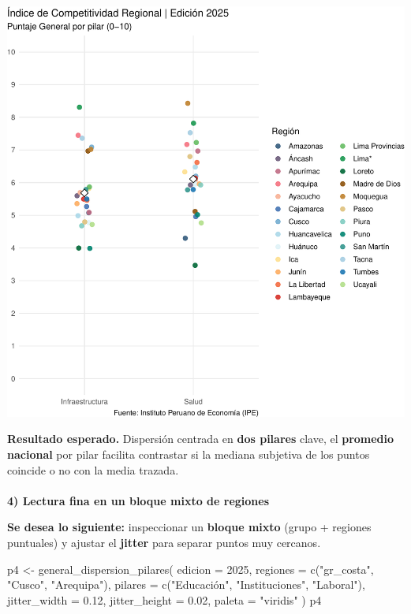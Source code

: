 \documentclass[
  11pt,
  letterpaper,
  DIV=11,
  numbers=noendperiod]{scrartcl}
\makeatletter
\let\oldparagraph\paragraph
\renewcommand{\paragraph}{
    \@ifstar
      \xxxParagraphStar
      \xxxParagraphNoStar
  }
\newcommand{\xxxParagraphStar}[1]{\oldparagraph*{#1}\mbox{}}
\newcommand{\xxxParagraphNoStar}[1]{\oldparagraph{#1}\mbox{}}
\newenvironment{Shaded}{\begin{snugshade}}{\end{snugshade}}
\newcommand{\AttributeTok}[1]{\textcolor[rgb]{0.40,0.45,0.13}{#1}}
\newcommand{\DecValTok}[1]{\textcolor[rgb]{0.68,0.00,0.00}{#1}}
\newcommand{\FloatTok}[1]{\textcolor[rgb]{0.68,0.00,0.00}{#1}}
\newcommand{\FunctionTok}[1]{\textcolor[rgb]{0.28,0.35,0.67}{#1}}
\newcommand{\NormalTok}[1]{\textcolor[rgb]{0.00,0.23,0.31}{#1}}
\newcommand{\OtherTok}[1]{\textcolor[rgb]{0.00,0.23,0.31}{#1}}
\newcommand{\StringTok}[1]{\textcolor[rgb]{0.13,0.47,0.30}{#1}}
\makeatother
\begin{document}
\includegraphics{Manual_files/figure-pdf/unnamed-chunk-23-1.pdf}

\textbf{Resultado esperado.} Dispersión centrada en \textbf{dos pilares}
clave, el \textbf{promedio nacional} por pilar facilita contrastar si la
mediana subjetiva de los puntos coincide o no con la media trazada.

\paragraph{\texorpdfstring{\textbf{4) Lectura fina en un bloque mixto de
regiones}}{4) Lectura fina en un bloque mixto de regiones}}\label{lectura-fina-en-un-bloque-mixto-de-regiones}

\textbf{Se desea lo siguiente:} inspeccionar un \textbf{bloque mixto}
(grupo + regiones puntuales) y ajustar el \textbf{jitter} para separar
puntos muy cercanos.

\begin{Shaded}
\begin{Highlighting}[]
\NormalTok{p4 }\OtherTok{\textless{}{-}} \FunctionTok{general\_dispersion\_pilares}\NormalTok{(}
  \AttributeTok{edicion =} \DecValTok{2025}\NormalTok{,}
  \AttributeTok{regiones =} \FunctionTok{c}\NormalTok{(}\StringTok{"gr\_costa"}\NormalTok{, }\StringTok{"Cusco"}\NormalTok{, }\StringTok{"Arequipa"}\NormalTok{),}
  \AttributeTok{pilares  =} \FunctionTok{c}\NormalTok{(}\StringTok{"Educación"}\NormalTok{, }\StringTok{"Instituciones"}\NormalTok{, }\StringTok{"Laboral"}\NormalTok{),}
  \AttributeTok{jitter\_width  =} \FloatTok{0.12}\NormalTok{,}
  \AttributeTok{jitter\_height =} \FloatTok{0.02}\NormalTok{,}
  \AttributeTok{paleta =} \StringTok{"viridis"}
\NormalTok{)}
\NormalTok{p4}
\end{Highlighting}
\end{Shaded}
\end{document}
